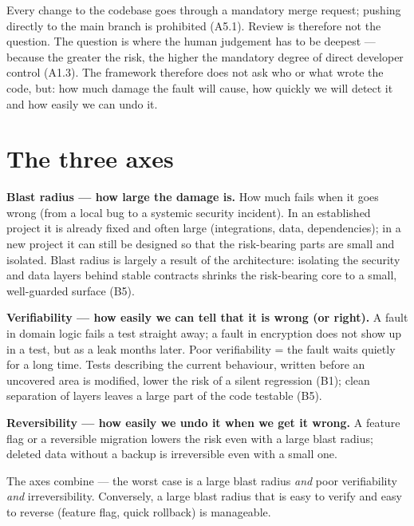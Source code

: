 Every change to the codebase goes through a mandatory merge request; pushing directly to the main branch is prohibited (A5.1).
Review is therefore not the question.
The question is where the human judgement has to be deepest --- because the greater the risk, the higher the mandatory degree of direct developer control (A1.3).
The framework therefore does not ask who or what wrote the code, but: how much damage the fault will cause, how quickly we will detect it and how easily we can undo it.

\section*{The three axes}

\noindent
\textbf{Blast radius --- how large the damage is.}
How much fails when it goes wrong (from a local bug to a systemic security incident).
In an established project it is already fixed and often large (integrations, data, dependencies); in a new project it can still be designed so that the risk-bearing parts are small and isolated.
Blast radius is largely a result of the architecture: isolating the security and data layers behind stable contracts shrinks the risk-bearing core to a small, well-guarded surface (B5).

\smallskip
\noindent
\textbf{Verifiability --- how easily we can tell that it is wrong (or right).}
A fault in domain logic fails a test straight away; a fault in encryption does not show up in a test, but as a leak months later.
Poor verifiability = the fault waits quietly for a long time.
Tests describing the current behaviour, written before an uncovered area is modified, lower the risk of a silent regression (B1); clean separation of layers leaves a large part of the code testable (B5).

\smallskip
\noindent
\textbf{Reversibility --- how easily we undo it when we get it wrong.}
A feature flag or a reversible migration lowers the risk even with a large blast radius; deleted data without a backup is irreversible even with a small one.

\begin{calloutplain}[amber]
The axes combine --- the worst case is a large blast radius \emph{and} poor verifiability \emph{and} irreversibility.
Conversely, a large blast radius that is easy to verify and easy to reverse (feature flag, quick rollback) is manageable.
\end{calloutplain}

